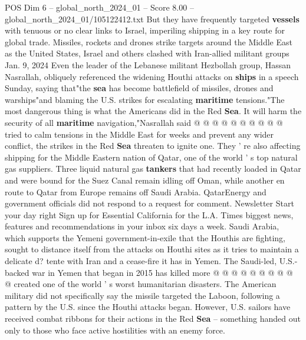 \begin{textsample}{POS Dim 6 – global\_north\_2024\_01 – Score 8.00 – global\_north\_2024\_01/105122412.txt}
But they have frequently targeted \textbf{vessels} with tenuous or no clear links to Israel, imperiling shipping in a key route for global trade.
Missiles, rockets and drones strike targets around the Middle East as the United States, Israel and others clashed with Iran-allied militant groups Jan. 9, 2024 Even the leader of the Lebanese militant Hezbollah group, Hassan Nasrallah, obliquely referenced the widening Houthi attacks on \textbf{ships} in a speech Sunday, saying that"the \textbf{sea} has become battlefield of missiles, drones and warships"and blaming the U.S. strikes for escalating \textbf{maritime} tensions."The most dangerous thing is what the Americans did in the Red \textbf{Sea}.
It will harm the security of all \textbf{maritime} navigation,"Nasrallah said @ @ @ @ @ @ @ @ @ @ tried to calm tensions in the Middle East for weeks and prevent any wider conflict, the strikes in the Red \textbf{Sea} threaten to ignite one.
They ' re also affecting shipping for the Middle Eastern nation of Qatar, one of the world ' s top natural gas suppliers.
Three liquid natural gas \textbf{tankers} that had recently loaded in Qatar and were bound for the Suez Canal remain idling off Oman, while another en route to Qatar from Europe remains off Saudi Arabia.
QatarEnergy and government officials did not respond to a request for comment.
Newsletter Start your day right Sign up for Essential California for the L.A.
Times biggest news, features and recommendations in your inbox six days a week.
Saudi Arabia, which supports the Yemeni government-in-exile that the Houthis are fighting, sought to distance itself from the attacks on Houthi sites as it tries to maintain a delicate d? tente with Iran and a cease-fire it has in Yemen.
The Saudi-led, U.S.-backed war in Yemen that began in 2015 has killed more @ @ @ @ @ @ @ @ @ @ created one of the world ' s worst humanitarian disasters.
The American military did not specifically say the missile targeted the Laboon, following a pattern by the U.S. since the Houthi attacks began.
However, U.S. sailors have received combat ribbons for their actions in the Red \textbf{Sea} -- something handed out only to those who face active hostilities with an enemy force.

\end{textsample}
